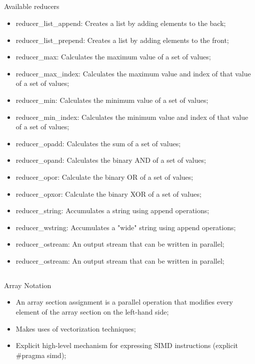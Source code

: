 \documentclass{beamer}
\begin{document}
\scriptsize

\subsection{}
\begin{frame}[fragile]
	\begin{block}{Available reducers}
		\begin{itemize}
			\item reducer\_list\_append: Creates a list by adding elements to the back;
			\item reducer\_list\_prepend: Creates a list by adding elements to the front;
			\item reducer\_max: Calculates the maximum value of a set of values;
			\item reducer\_max\_index: Calculates the maximum value and index of that value of a set of values;
			\item reducer\_min: Calculates the minimum value of a set of values;
			\item reducer\_min\_index: Calculates the minimum value and index of that value of a set of values;
			\item reducer\_opadd: Calculates the sum of a set of values;
			\item reducer\_opand: Calculates the binary AND of a set of values;
			\item reducer\_opor: Calculate the binary OR of a set of values;
			\item reducer\_opxor: Calculate the binary XOR of a set of values;
			\item reducer\_string: Accumulates a string using append operations;
			\item reducer\_wstring: Accumulates a "wide" string using append operations;
			\item reducer\_ostream: An output stream that can be written in parallel;
			\item reducer\_ostream: An output stream that can be written in parallel;
		\end{itemize}
	\end{block}
\end{frame}

\normalsize

\subsection{}
\begin{frame}[fragile]
	\begin{block}{Array Notation}
		\begin{itemize}
			\item An array section assignment is a parallel operation that modifies every element of the array section on the left-hand side;
			\item Makes uses of vectorization techniques;
			\item Explicit high-level mechanism for expressing SIMD instructions (explicit \#pragma simd);			
		\end{itemize}
	\end{block}
\end{frame}
\end{document}
